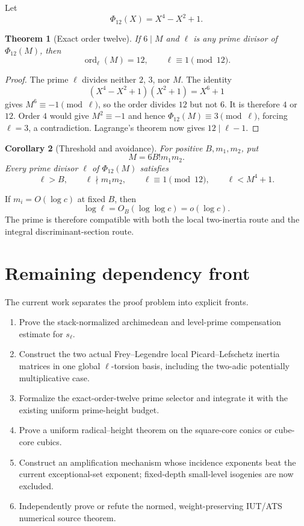 \documentclass[11pt]{amsart}
\newtheorem{theorem}{Theorem}[section]
\newtheorem{corollary}[theorem]{Corollary}
\theoremstyle{definition}
\theoremstyle{remark}
\newcommand{\ord}{\operatorname{ord}}
\begin{document}
Let
\[
 \Phi_{12}(X)=X^4-X^2+1.
\]

\begin{theorem}[Exact order twelve]
If $6\mid M$ and $\ell$ is any prime divisor of $\Phi_{12}(M)$, then
\[
 \ord_\ell(M)=12,
 \qquad \ell\equiv1\pmod{12}.
\]
\end{theorem}

\begin{proof}
The prime $\ell$ divides neither $2$, $3$, nor $M$.  The identity
\[
 (X^4-X^2+1)(X^2+1)=X^6+1
\]
gives $M^6\equiv-1\pmod\ell$, so the order divides $12$ but not $6$.  It is therefore $4$ or $12$.  Order $4$ would give $M^2\equiv-1$ and hence
$\Phi_{12}(M)\equiv3\pmod\ell$, forcing $\ell=3$, a contradiction.  Lagrange's theorem now gives $12\mid\ell-1$.
\end{proof}

\begin{corollary}[Threshold and avoidance]
For positive $B,m_1,m_2$, put
\[
 M=6B!m_1m_2.
\]
Every prime divisor $\ell$ of $\Phi_{12}(M)$ satisfies
\[
 \ell>B,\qquad \ell\nmid m_1m_2,\qquad
 \ell\equiv1\pmod{12},\qquad
 \ell<M^4+1.
\]
\end{corollary}

If $m_i=O(\log c)$ at fixed $B$, then
\[
 \log\ell=O_B(\log\log c)=o(\log c).
\]
The prime is therefore compatible with both the local two-inertia route and the integral discriminant-section route.

\section{Remaining dependency front}

The current work separates the proof problem into explicit fronts.

\begin{enumerate}
\item Prove the stack-normalized archimedean and level-prime compensation estimate for $s_\ell$.
\item Construct the two actual Frey--Legendre local Picard--Lefschetz inertia matrices in one global $\ell$-torsion basis, including the two-adic potentially multiplicative case.
\item Formalize the exact-order-twelve prime selector and integrate it with the existing uniform prime-height budget.
\item Prove a uniform radical--height theorem on the square-core conics or cube-core cubics.
\item Construct an amplification mechanism whose incidence exponents beat the current exceptional-set exponent; fixed-depth small-level isogenies are now excluded.
\item Independently prove or refute the normed, weight-preserving IUT/ATS numerical source theorem.
\end{enumerate}
\end{document}
